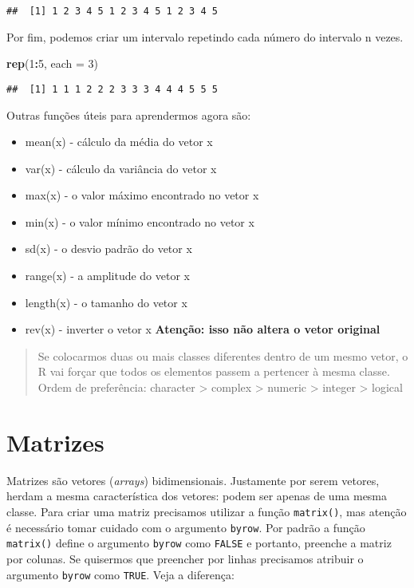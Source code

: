 \documentclass[]{book}
\newenvironment{Shaded}{\begin{snugshade}}{\end{snugshade}}
\newcommand{\DataTypeTok}[1]{\textcolor[rgb]{0.13,0.29,0.53}{#1}}
\newcommand{\DecValTok}[1]{\textcolor[rgb]{0.00,0.00,0.81}{#1}}
\newcommand{\KeywordTok}[1]{\textcolor[rgb]{0.13,0.29,0.53}{\textbf{#1}}}
\newcommand{\NormalTok}[1]{#1}
\newcommand{\OperatorTok}[1]{\textcolor[rgb]{0.81,0.36,0.00}{\textbf{#1}}}
\providecommand{\tightlist}{%
  \setlength{\itemsep}{0pt}\setlength{\parskip}{0pt}}
\theoremstyle{definition}
\theoremstyle{definition}
\theoremstyle{definition}
\theoremstyle{remark}
\begin{document}
\begin{verbatim}
##  [1] 1 2 3 4 5 1 2 3 4 5 1 2 3 4 5
\end{verbatim}

Por fim, podemos criar um intervalo repetindo cada número do intervalo n vezes.

\begin{Shaded}
\begin{Highlighting}[]
\KeywordTok{rep}\NormalTok{(}\DecValTok{1}\OperatorTok{:}\DecValTok{5}\NormalTok{, }\DataTypeTok{each =} \DecValTok{3}\NormalTok{)}
\end{Highlighting}
\end{Shaded}

\begin{verbatim}
##  [1] 1 1 1 2 2 2 3 3 3 4 4 4 5 5 5
\end{verbatim}

Outras funções úteis para aprendermos agora são:

\begin{itemize}
\tightlist
\item
  mean(x) - cálculo da média do vetor x
\item
  var(x) - cálculo da variância do vetor x
\item
  max(x) - o valor máximo encontrado no vetor x
\item
  min(x) - o valor mínimo encontrado no vetor x
\item
  sd(x) - o desvio padrão do vetor x
\item
  range(x) - a amplitude do vetor x
\item
  length(x) - o tamanho do vetor x
\item
  rev(x) - inverter o vetor x \textbf{Atenção: isso não altera o vetor original}
\end{itemize}

\begin{quote}
Se colocarmos duas ou mais classes diferentes dentro de um mesmo vetor, o R vai forçar que todos os elementos passem a pertencer à mesma classe. Ordem de preferência: character \textgreater{} complex \textgreater{} numeric \textgreater{} integer \textgreater{} logical
\end{quote}

\hypertarget{matrizes}{%
\section{Matrizes}\label{matrizes}}

Matrizes são vetores (\emph{arrays}) bidimensionais. Justamente por serem vetores, herdam a mesma característica dos vetores: podem ser apenas de uma mesma classe. Para criar uma matriz precisamos utilizar a função \texttt{matrix()}, mas atenção é necessário tomar cuidado com o argumento \texttt{byrow}. Por padrão a função \texttt{matrix()} define o argumento \texttt{byrow} como \texttt{FALSE} e portanto, preenche a matriz por colunas. Se quisermos que preencher por linhas precisamos atribuir o argumento \texttt{byrow} como \texttt{TRUE}. Veja a diferença:
\end{document}
